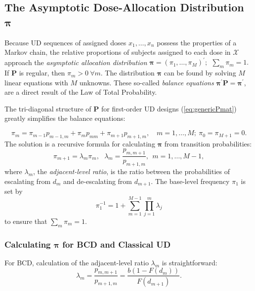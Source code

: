 \subsection{The Asymptotic Dose-Allocation Distribution $\boldsymbol{\pi}$}

Because UD sequences of assigned doses $x_1,\ldots,x_n$ possess the properties of a Markov chain, the relative proportions of subjects assigned to each dose in $\mathcal{X}$ approach the \emph{asymptotic allocation distribution} $\boldsymbol{\pi}=\left(\pi_1,\ldots,\pi_M\right)^{\prime};\ \ \sum_m \pi_m=1.$  If $\mathbf{P}$ is regular, then $\pi_m>0\ \forall m$. The distribution $\boldsymbol{\pi}$ can be found by solving $M$ linear equations with $M$ unknowns. These so-called \emph{balance equations} $\boldsymbol{\pi}^\prime \mathbf{P} = \boldsymbol{\pi}^\prime$, are a direct result of the Law of Total Probability.

The tri-diagonal structure of $\mathbf{P}$ for first-order UD designs (\ref{eq:genericPmat}) greatly simplifies the balance equations:

\begin{equation}\label{eq:balance}
\pi_m=\pi_{m-1}p_{m-1,m}+\pi_mp_{mm}+\pi_{m+1}p_{m+1,m},\quad
m=1,\ldots,M;\ \pi_0=\pi_{M+1}=0.
\end{equation}
The solution is a recursive formula for calculating $\boldsymbol{\pi}$ from transition probabilities:
\begin{equation}\label{eq:balance_solution}
\pi_{m+1}=\lambda_m \pi_m,\ \ \ \lambda_m=\frac{p_{m,m+1}}{p_{m+1,m}},\ \  m=1,\ldots,M-1,
\end{equation}
where $\lambda_m$,  the \emph{adjacent-level ratio}, is the ratio between the probabilities of escalating from $d_m$ and de-escalating from $d_{m+1}$. The base-level frequency $\pi_1$ is set by
\begin{equation*}
\pi_1^{-1}=1+\displaystyle\sum_{m=1}^{M-1}\displaystyle\prod_{j=1}^m\lambda_j
\end{equation*}
\noindent to ensure that $\sum_m \pi_m=1$.

\subsubsection{Calculating $\boldsymbol{\pi}$ for BCD and Classical UD}

For BCD, calculation of the adjacent-level ratio $\lambda_m$ is straightforward:
\begin{equation}\label{eq:BCDlambda}
\lambda_m=\frac{p_{m,m+1}}{p_{m+1,m}}=\frac{b\left(1-F(d_m)\right)}{F(d_{m+1})}.
\end{equation}

